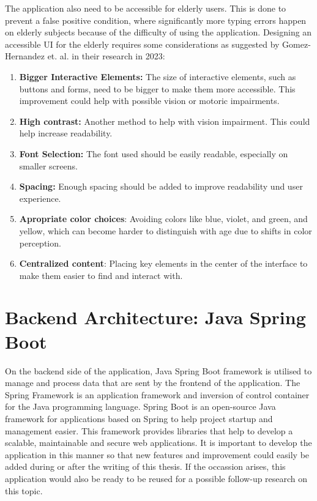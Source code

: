 The application also need to be accessible for elderly users.
This is done to prevent a false positive condition, where significantly more typing errors happen on elderly subjects because of the difficulty of using the application.
Designing an accessible \ac{UI} for the elderly requires some considerations as suggested by Gomez-Hernandez et. al. in their research in 2023\cite{hernandez2023}:
\begin{enumerate}
    \item \textbf{Bigger Interactive Elements:} The size of interactive elements, such as buttons and forms, need to be bigger to make them more accessible.
    This improvement could help with possible vision or motoric impairments.
    \item \textbf{High contrast:} Another method to help with vision impairment.
    This could help increase readability.
    \item \textbf{Font Selection:} The font used should be easily readable, especially on smaller screens.
    \item \textbf{Spacing:} Enough spacing should be added to improve readability und user experience.
    \item \textbf{Apropriate color choices}: Avoiding colors like blue, violet, and green, and yellow, which can become harder to distinguish with age due to shifts in color perception.
    \item \textbf{Centralized content}: Placing key elements in the center of the interface to make them easier to find and interact with.

\end{enumerate}


\section{Backend Architecture: Java Spring Boot}
On the backend side of the application, Java Spring Boot framework is utilised to manage and process data that are sent by the frontend of the application.
The Spring Framework is an application framework and inversion of control container for the Java programming language.
Spring Boot is an open-source Java framework for applications based on Spring to help project startup and management easier.
This framework provides libraries that help to develop a scalable, maintainable and secure web applications.
It is important to develop the application in this manner so that new features and improvement could easily be added during or after the writing of this thesis.
If the occassion arises, this application would also be ready to be reused for a possible follow-up research on this topic.

